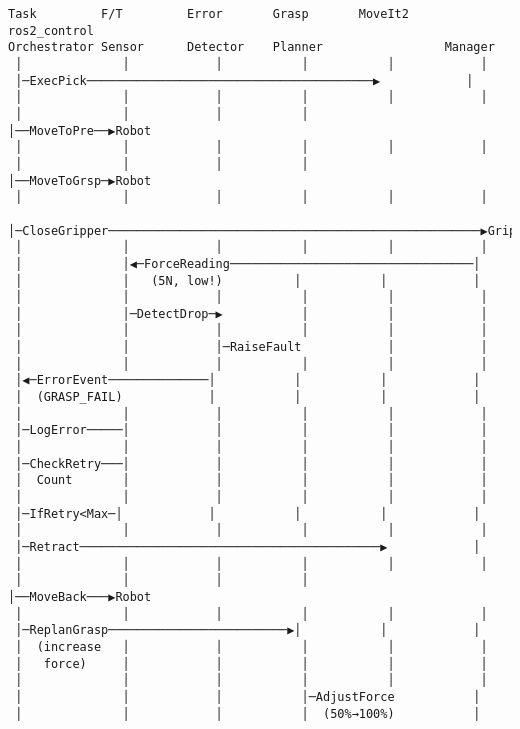 \documentclass[
]{article}
\begin{document}
\begin{verbatim}
Task         F/T         Error       Grasp       MoveIt2     ros2_control
Orchestrator Sensor      Detector    Planner                 Manager
 │              │            │           │           │            │
 │─ExecPick────────────────────────────────────────▶            │
 │              │            │           │           │            │
 │              │            │           │           │──MoveToPre──▶Robot
 │              │            │           │           │            │
 │              │            │           │           │──MoveToGrsp─▶Robot
 │              │            │           │           │            │
 │─CloseGripper────────────────────────────────────────────────────▶Gripper
 │              │            │           │           │            │
 │              │◀─ForceReading──────────────────────────────────│
 │              │   (5N, low!)          │           │            │
 │              │            │           │           │            │
 │              │─DetectDrop─▶           │           │            │
 │              │            │           │           │            │
 │              │            │─RaiseFault            │            │
 │              │            │           │           │            │
 │◀─ErrorEvent──────────────│           │           │            │
 │  (GRASP_FAIL)            │           │           │            │
 │              │            │           │           │            │
 │─LogError─────│            │           │           │            │
 │              │            │           │           │            │
 │─CheckRetry───│            │           │           │            │
 │  Count       │            │           │           │            │
 │              │            │           │           │            │
 │─IfRetry<Max─│            │           │           │            │
 │              │            │           │           │            │
 │─Retract──────────────────────────────────────────▶            │
 │              │            │           │           │            │
 │              │            │           │           │──MoveBack───▶Robot
 │              │            │           │           │            │
 │─ReplanGrasp─────────────────────────▶│           │            │
 │  (increase   │            │           │           │            │
 │   force)     │            │           │           │            │
 │              │            │           │           │            │
 │              │            │           │─AdjustForce           │
 │              │            │           │  (50%→100%)           │

\end{verbatim}
\end{document}
